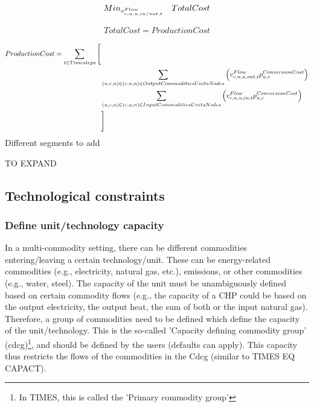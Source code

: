 \begin{align} \label{eq:objective}
Min_{\vFlow} \quad  TotalCost
\end{align}

\begin{align} \label{eq:objective_definition}
TotalCost = ProductionCost
\end{align}


\begin{align} \label{eq:production_cost}
ProductionCost = \sum_{\timesteps} \Bigg[& \nonumber \\
& \sum_{(\unit, \commodity, \node) \in \OutputCommoditiesUnitsNodes} \Big(\vFlow[\commodity, \node, \unit, out, \timestep] \pConversionCost \Big) \nonumber \\
& \sum_{(\unit, \commodity, \node) \in \InputCommoditiesUnitsNodes} \Big(\vFlow[\commodity, \node, \unit, in, \timestep]\pConversionCost \Big) \nonumber \\
& \Bigg]
\end{align}
{\color{red} Different segments to add}



{\color{red} TO EXPAND}






\subsection{Technological constraints}

\subsubsection{Define unit/technology capacity}

In a multi-commodity setting, there can be different commodities entering/leaving a certain technology/unit. These can be energy-related commodities (e.g., electricity, natural gas, etc.), emissions, or other commodities (e.g., water, steel). The capacity of the unit must be unambiguously defined based on certain commodity flows (e.g., the capacity of a CHP could be based on the output electricity, the output heat, the sum of both or the input natural gas). Therefore, a group of commodities need to be defined which define the capacity of the unit/technology. This is the so-called 'Capacity defining commodity group' (cdcg)\footnote{In TIMES, this is called the 'Primary commodity group'}, and should be defined by the users (defaults can apply). This capacity thus restricts the flows of the commodities in the Cdcg (similar to TIMES EQ CAPACT).

